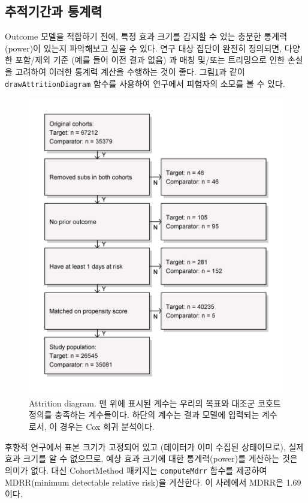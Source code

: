 \documentclass[11pt]{book}
\theoremstyle{definition}
\theoremstyle{definition}
\theoremstyle{definition}
\theoremstyle{remark}
\begin{document}
\subsection{추적기간과 통계력}\label{-}

Outcome 모델을 적합하기 전에, 특정 효과 크기를 감지할 수 있는 충분한
통계력(power)이 있는지 파악해보고 싶을 수 있다. 연구 대상 집단이 완전히
정의되면, 다양한 포함/제외 기준 (예를 들어 이전 결과 없음) 과 매칭
및/또는 트리밍으로 인한 손실을 고려하여 이러한 통계력 계산을 수행하는
것이 좋다. 그림\ref{fig:attrition}과 같이 \texttt{drawAttritionDiagram}
함수를 사용하여 연구에서 피험자의 소모를 볼 수 있다.

\begin{figure}

{\centering \includegraphics[width=0.7\linewidth]{images/PopulationLevelEstimation/attrition} 

}

\caption{Attrition diagram. 맨 위에 표시된 계수는 우리의 목표와 대조군 코호트 정의를 충족하는 계수들이다. 하단의 계수는 결과 모델에 입력되는 계수로서, 이 경우는 Cox 회귀 분석이다.}\label{fig:attrition}
\end{figure}

후향적 연구에서 표본 크기가 고정되어 있고 (데이터가 이미 수집된
상태이므로), 실제 효과 크기를 알 수 없으므로, 예상 효과 크기에 대한
통계력(power)를 계산하는 것은 의미가 없다. 대신 CohortMethod 패키지는
\texttt{computeMdrr} 함수를 제공하여 MDRR(minimum detectable relative
risk)을 계산한다. 이 사례에서 MDRR은 1.69이다.
 
\end{document}
